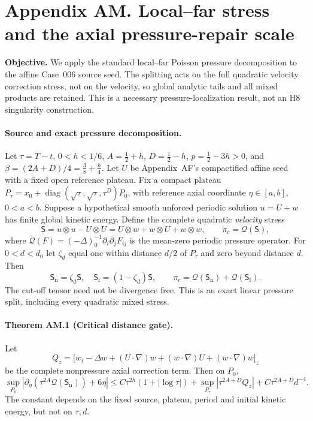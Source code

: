 \clearpage
\section*{Appendix AM. Local--far stress and the axial pressure-repair scale}
\noindent\textbf{Objective.} We apply the standard local--far Poisson pressure decomposition to the affine Case~006 source seed. The splitting acts on the full quadratic velocity correction stress, not on the velocity, so global analytic tails and all mixed products are retained. This is a necessary pressure-localization result, not an H8 singularity construction.

\paragraph{Source and exact pressure decomposition.}
Let $\tau=T-t$, $0<h<1/6$, $A=\frac12+h$, $D=\frac12-h$, $p=\frac12-3h>0$, and $\beta=(2A+D)/4=\frac38+\frac h4$.
Let $U$ be Appendix~AF's compactified affine seed with a fixed open reference plateau. Fix a compact plateau $P_\tau=x_0+\operatorname{diag}(\sqrt\tau,\sqrt\tau,\tau^D)P_0$, with reference axial coordinate $\eta\in[a,b]$, $0<a<b$. Suppose a hypothetical smooth unforced periodic solution $u=U+w$ has finite global kinetic energy. Define the complete quadratic \emph{velocity} stress
\[
\mathsf S=u\otimes u-U\otimes U
=U\otimes w+w\otimes U+w\otimes w,\qquad
\pi_c=\mathcal Q(\mathsf S),
\]
where $\mathcal Q(F)=(-\Delta)^{-1}_0\partial_i\partial_jF_{ij}$ is the mean-zero periodic pressure operator. For $0<d<d_0$ let $\zeta_d$ equal one within distance $d/2$ of $P_\tau$ and zero beyond distance $d$. Then
\[
\mathsf S_{\mathrm n}=\zeta_d\mathsf S,\quad
\mathsf S_{\mathrm f}=(1-\zeta_d)\mathsf S,\qquad
\pi_c=\mathcal Q(\mathsf S_{\mathrm n})+\mathcal Q(\mathsf S_{\mathrm f}).
\]
The cut-off tensor need not be divergence free. This is an exact linear pressure split, including every quadratic mixed stress.

\paragraph{Theorem AM.1 (Critical distance gate).}
Let
\[
Q_z=\bigl[w_t-\Delta w+(U\cdot\nabla)w+
(w\cdot\nabla)U+(w\cdot\nabla)w\bigr]_z
\]
be the complete nonpressure axial correction term. Then on $P_0$,
\[
\boxed{\sup_{P_0}\left|
\partial_\eta\left(\tau^{2A}\mathcal Q(\mathsf S_{\mathrm n})\right)+6\eta
\right|\le C\tau^{2h}(1+|\log\tau|)
+\sup_{P_\tau}|\tau^{2A+D}Q_z|+C\tau^{2A+D}d^{-4}.}
\]
The constant depends on the fixed source, plateau, period and initial kinetic energy, but not on $\tau,d$.

